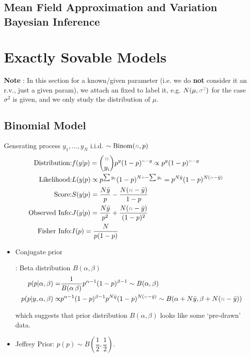     




    

\subsection{Mean Field Approximation and Variation Bayesian Inference}



\section{Exactly Sovable Models}
\textbf{Note} : In this section for a known/given parameter (i.e. we do \textbf{not} consider it an r.v., just a given param), we attach an fixed to label it, e.g. $ N(\mu ,\fixed{\sigma^2} ) $ for the case $ \sigma^2 $ is given, and we only study the distribution of $ \mu  $.


    
\subsection{Binomial Model}\label{SubSubSectionBayesianBinomial}
Generating process $ y_1,\ldots,y_N $ i.i.d. $ \sim \mathrm{Binom}(\fixed{n},p) $
\begin{align}
    \text{Distribution:}&f(y|p)=\binom{\fixed{n}}{y_i}p^{y}(1-p)^{\fixed{n}-y}\propto p^y(1-p)^{\fixed{n}-y}\\
    \text{Likelihood:}&L(y|p)\propto p^{\sum y_i}(1-p )^{N\fixed{n}-\sum y_i}=p^{N\bar{y}}(1-p)^{N(\fixed{n}-\bar{y})}\\
    \text{Score:}&S(y|p)=\dfrac{N\bar{y}}{p}- \dfrac{N(\fixed{n}-\bar{y})}{1-p}\\
    \text{Observed Info:}&J(y|p)=\dfrac{N\bar{y}}{p^2}+\dfrac{N(\fixed{n}-\bar{y})}{(1-p)^2}\\
    \text{Fisher Info:}&I(p)=\dfrac{N}{p(1-p)}
\end{align}


\begin{itemize}[topsep=2pt,itemsep=0pt]
    \item \hypertarget{BinomConjugate}{Conjugate prior}: Beta distribution $ B(\alpha ,\beta ) $
    \begin{align}
        p(p |\alpha ,\beta )=&\dfrac{ 1 }{ B(\alpha \, \beta ) } p ^{\alpha -1}(1-p )^{\beta -1}\sim B(\alpha ,\beta ) \\
        p(p |y,\alpha ,\beta )\propto &  p ^{\alpha -1}(1-p )^{\beta -1}p^{N\bar{y}}(1-p)^{N(\fixed{n}-\bar{y})}\sim B(\alpha +N\bar{y}, \beta +N(\fixed{n}-\bar{y}))
    \end{align}

    which suggests that prior distribution $ B(\alpha ,\beta ) $ looks like some `pre-drawn' data.
    \item Jeffrey Prior: $ p(p)\sim B(\dfrac{ 1 }{ 2 } , \dfrac{ 1 }{ 2 }) $.
\end{itemize}


